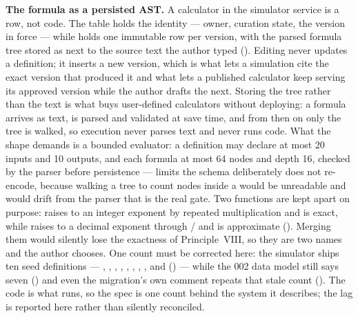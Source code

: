 \textbf{The formula as a persisted AST.} A calculator in the simulator service
is a row, not code. The  table holds the identity --- owner,
curation state, the version in force --- while 
holds one immutable row per version, with the parsed formula tree stored as
 next to the source text the author typed
().
Editing never updates a definition; it inserts a new version, which is what lets
a simulation cite the exact version that produced it and what lets a published
calculator keep serving its approved version while the author drafts the next.
Storing the tree rather than the text is what buys user-defined calculators
without deploying: a formula arrives as text, is parsed and validated at save
time, and from then on only the tree is walked, so execution never parses text
and never runs code. What the shape demands is a bounded evaluator: a definition
may declare at most 20 inputs and 10 outputs, and each formula at most 64 nodes
and depth 16, checked by the parser before persistence --- limits the schema
deliberately does not re-encode, because walking a tree to count nodes inside a
 would be unreadable and would drift from the parser that is the
real gate. Two functions are kept apart on purpose:  raises to an
integer exponent by repeated multiplication and is exact, while 
raises to a decimal exponent through / and is approximate
(). Merging
them would silently lose the exactness of Principle~VIII, so they are two names
and the author chooses. One count must be corrected here: the simulator ships
ten seed definitions --- , , ,
, , , ,
,  and 
() --- while the 002
data model still says seven ()
and even the migration's own comment repeats that stale count
(). The code is what runs, so the
spec is one count behind the system it describes; the lag is reported here
rather than silently reconciled.

